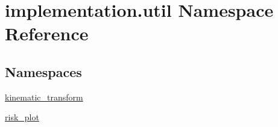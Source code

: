 \hypertarget{namespaceimplementation_1_1util}{}\section{implementation.\+util Namespace Reference}
\label{namespaceimplementation_1_1util}
\subsection*{Namespaces}
\begin{DoxyCompactItemize}
\item 
 \hyperlink{namespaceimplementation_1_1util_1_1kinematic__transform}{kinematic\+\_\+transform}
\item 
 \hyperlink{namespaceimplementation_1_1util_1_1risk__plot}{risk\+\_\+plot}
\end{DoxyCompactItemize}
